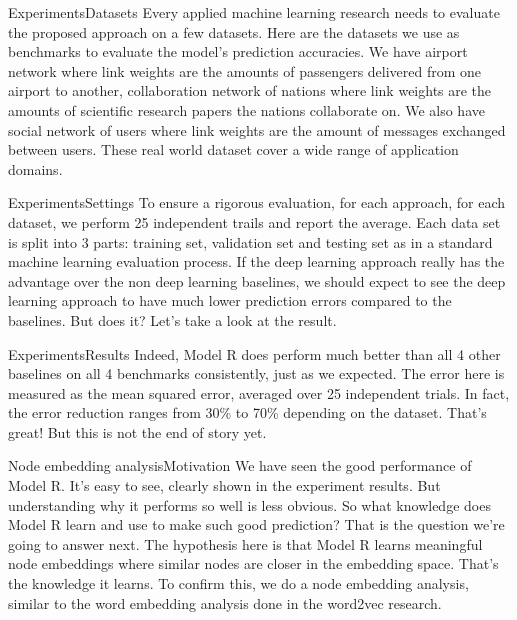 \documentclass{beamer}
\begin{document}
\begin{frame}{Experiments}{Datasets}
Every applied machine learning research needs to evaluate the proposed approach on a few datasets. Here are the datasets we use as benchmarks to evaluate the model's prediction accuracies. We have airport network where link weights are the amounts of passengers delivered from one airport to another, collaboration network of nations where link weights are the amounts of scientific research papers the nations collaborate on. We also have social network of users where link weights are the amount of messages exchanged between users. These real world dataset cover a wide range of application domains.
\end{frame}

\begin{frame}{Experiments}{Settings}
To ensure a rigorous evaluation, for each approach, for each dataset, we perform 25 independent trails and report the average. Each data set is split into 3 parts: training set, validation set and testing set as in a standard machine learning evaluation process. If the deep learning approach really has the advantage over the non deep learning baselines, we should expect to see the deep learning approach to have much lower prediction errors compared to the baselines. But does it? Let's take a look at the result.
\end{frame}

\begin{frame}{Experiments}{Results}
Indeed, Model R does perform much better than all 4 other baselines on all 4 benchmarks consistently, just as we expected. The error here is measured as the mean squared error, averaged over 25 independent trials. In fact, the error reduction ranges from 30\% to 70\% depending on the dataset. That's great! But this is not the end of story yet.
\end{frame}

\begin{frame}{Node embedding analysis}{Motivation}
We have seen the good performance of Model R. It's easy to see, clearly shown in the experiment results. But understanding why it performs so well is less obvious. So what knowledge does Model R learn and use to make such good prediction? That is the question we're going to answer next. The hypothesis here is that Model R learns meaningful node embeddings where similar nodes are closer in the embedding space. That's the knowledge it learns. To confirm this, we do a node embedding analysis, similar to the word embedding analysis done in the word2vec research.
\end{frame}
\end{document}
